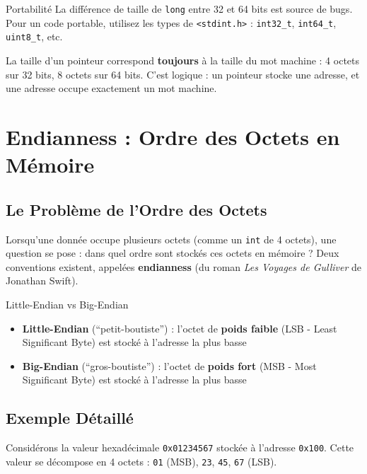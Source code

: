 \documentclass[10pt,a4paper]{article}
\begin{document}
\begin{warningbox}{Portabilité}
La différence de taille de \texttt{long} entre 32 et 64 bits est source de bugs. Pour un code portable, utilisez les types de \texttt{<stdint.h>} : \texttt{int32\_t}, \texttt{int64\_t}, \texttt{uint8\_t}, etc.
\end{warningbox}

La taille d'un pointeur correspond \textbf{toujours} à la taille du mot machine : 4 octets sur 32 bits, 8 octets sur 64 bits. C'est logique : un pointeur stocke une adresse, et une adresse occupe exactement un mot machine.

\section{Endianness : Ordre des Octets en Mémoire}

\subsection{Le Problème de l'Ordre des Octets}

Lorsqu'une donnée occupe plusieurs octets (comme un \texttt{int} de 4 octets), une question se pose : dans quel ordre sont stockés ces octets en mémoire ? Deux conventions existent, appelées \textbf{endianness} (du roman \textit{Les Voyages de Gulliver} de Jonathan Swift).

\begin{definitionbox}{Little-Endian vs Big-Endian}
\begin{itemize}
    \item \textbf{Little-Endian} (``petit-boutiste'') : l'octet de \textbf{poids faible} (LSB - Least Significant Byte) est stocké à l'adresse la plus basse
    \item \textbf{Big-Endian} (``gros-boutiste'') : l'octet de \textbf{poids fort} (MSB - Most Significant Byte) est stocké à l'adresse la plus basse
\end{itemize}
\end{definitionbox}

\subsection{Exemple Détaillé}

Considérons la valeur hexadécimale \texttt{0x01234567} stockée à l'adresse \texttt{0x100}. Cette valeur se décompose en 4 octets : \texttt{01} (MSB), \texttt{23}, \texttt{45}, \texttt{67} (LSB).
\end{document}
